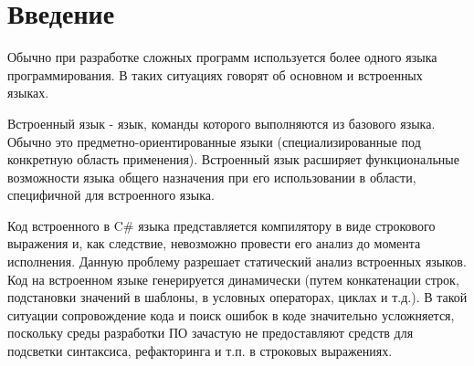\documentclass{matmex-diploma}
\begin{document}
\maketitle
\tableofcontents
\section*{Введение}

Обычно при разработке сложных программ используется более одного языка программирования. В таких ситуациях говорят об основном и встроенных языках.

Встроенный язык - язык, команды которого выполняются из базового языка. Обычно это предметно-ориентированные языки (специализированные под конкретную область применения). Встроенный язык расширяет функциональные возможности языка общего назначения при его использовании в области, специфичной для встроенного языка.

Код встроенного в C\# языка представляется компилятору в виде строкового выражения и, как следствие, невозможно провести его анализ до момента исполнения. Данную проблему разрешает статический анализ встроенных языков.
Код на встроенном языке генерируется динамически (путем конкатенации строк, подстановки значений в шаблоны, в условных операторах, циклах и т.д.). В такой ситуации сопровождение кода и поиск ошибок в коде значительно усложняется, поскольку среды разработки ПО зачастую не предоставляют средств для подсветки синтаксиса, рефакторинга и т.п. в строковых выражениях.
\end{document}
